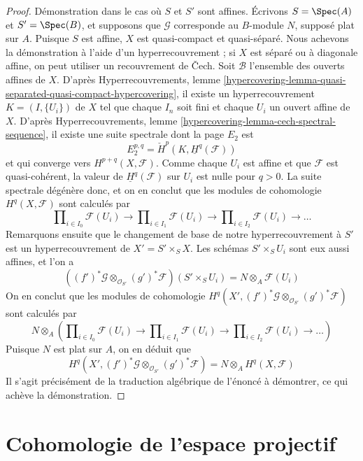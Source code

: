 \begin{proof}
\medskip\noindent
Démonstration dans le cas où $S$ et $S'$ sont affines. Écrivons $S = \Spec(A)$ et $S' = \Spec(B)$,
et supposons que $\mathcal{G}$ corresponde au $B$-module $N$, supposé plat sur
$A$. Puisque $S$ est affine, $X$ est quasi-compact et quasi-séparé.
Nous achevons la démonstration à l'aide d'un hyperrecouvrement ; si $X$ est séparé
ou à diagonale affine, on peut utiliser un recouvrement de {\v C}ech.
Soit $\mathcal{B}$ l'ensemble des ouverts affines de $X$. D'après
Hyperrecouvrements,
lemme \ref{hypercovering-lemma-quasi-separated-quasi-compact-hypercovering},
il existe un hyperrecouvrement $K = (I, \{U_i\})$ de $X$ tel que chaque
$I_n$ soit fini et chaque $U_i$ un ouvert affine de $X$. D'après
Hyperrecouvrements, lemme \ref{hypercovering-lemma-cech-spectral-sequence},
il existe une suite spectrale dont la page $E_2$ est
$$
E_2^{p, q} = \check{H}^p(K, \underline{H}^q(\mathcal{F}))
$$
et qui converge vers $H^{p + q}(X, \mathcal{F})$. Comme chaque $U_i$ est affine et
que $\mathcal{F}$ est quasi-cohérent, la valeur de
$\underline{H}^q(\mathcal{F})$ sur $U_i$ est nulle pour $q > 0$. La suite
spectrale dégénère donc, et on en conclut que les modules de
cohomologie $H^q(X, \mathcal{F})$ sont calculés par
$$
\prod\nolimits_{i \in I_0} \mathcal{F}(U_i)
\to
\prod\nolimits_{i \in I_1} \mathcal{F}(U_i)
\to
\prod\nolimits_{i \in I_2} \mathcal{F}(U_i)
\to \ldots
$$
Remarquons ensuite que le changement de base de notre hyperrecouvrement à
$S'$ est un hyperrecouvrement de $X' = S' \times_S X$.
Les schémas $S' \times_S U_i$ sont eux aussi affines,
et l'on a
$$
\left((f')^*\mathcal{G} \otimes_{\mathcal{O}_{S'}} (g')^*\mathcal{F}\right)
(S' \times_S U_i) =
N \otimes_A \mathcal{F}(U_i)
$$
On en conclut que les modules de cohomologie
$H^q(X', (f')^*\mathcal{G} \otimes_{\mathcal{O}_{S'}} (g')^*\mathcal{F})$
sont calculés par
$$
N \otimes_A \left(
\prod\nolimits_{i \in I_0} \mathcal{F}(U_i)
\to
\prod\nolimits_{i \in I_1} \mathcal{F}(U_i)
\to
\prod\nolimits_{i \in I_2} \mathcal{F}(U_i)
\to \ldots
\right)
$$
Puisque $N$ est plat sur $A$, on en déduit que
$$
H^q(X', (f')^*\mathcal{G} \otimes_{\mathcal{O}_{S'}} (g')^*\mathcal{F})
=
N \otimes_A H^q(X, \mathcal{F})
$$
Il s'agit précisément de la traduction algébrique de l'énoncé
à démontrer, ce qui achève la démonstration.
\end{proof}







\section{Cohomologie de l'espace projectif}
\label{section-cohomology-projective-space}

